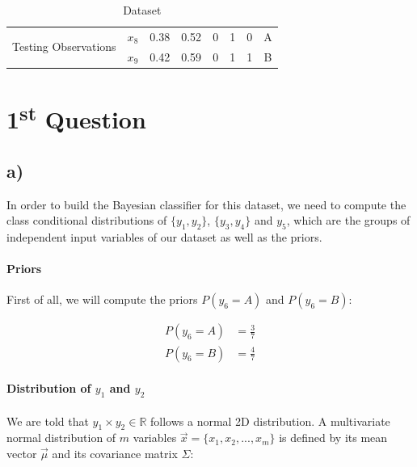 \documentclass{article}
\begin{document}
\begin{table}[h!]
\begin{tabular}{|cc|ccccc|c|}
    \multicolumn{1}{|c|}{\multirow{2}{*}{Testing Observations}}  & $x_8$ & \multicolumn{1}{c|}{0.38}  & \multicolumn{1}{c|}{0.52}  & \multicolumn{1}{c|}{0}     & \multicolumn{1}{c|}{1}     & 0     & A                           \\ \cline{2-8} 
    \multicolumn{1}{|c|}{}                                       & $x_9$ & \multicolumn{1}{c|}{0.42}  & \multicolumn{1}{c|}{0.59}  & \multicolumn{1}{c|}{0}     & \multicolumn{1}{c|}{1}     & 1     & B                           \\ \hline
  \end{tabular}
  \caption{Dataset}
  \label{tab:dataset}
\end{table}

\newpage

\section*{1\textsuperscript{st} Question}

\subsection*{a)}

In order to build the Bayesian classifier for this dataset, we need to compute the class conditional distributions of $\{y_1,y_2\}$, $\{y_3,y_4\}$ and $y_5$, which are the groups of independent input variables of our dataset as well as the priors.

\paragraph{Priors}

First of all, we will compute the priors $P(y_6=A)$ and $P(y_6=B)$:

\begin{align*}
  P(y_6=A) &= \frac{3}{7} \\
  P(y_6=B) &= \frac{4}{7} 
\end{align*}


\paragraph{Distribution of $y_1$ and $y_2$}
\paragraph{}

We are told that $y_1 \times y_2 \in \mathbb{R}$ follows a normal 2D distribution.
A multivariate normal distribution of $m$ variables $\vec{x} = \{x_1, x_2, ..., x_m\}$ is defined by its mean vector $\vec{\mu}$ and its covariance matrix $\Sigma$:
\end{document}
